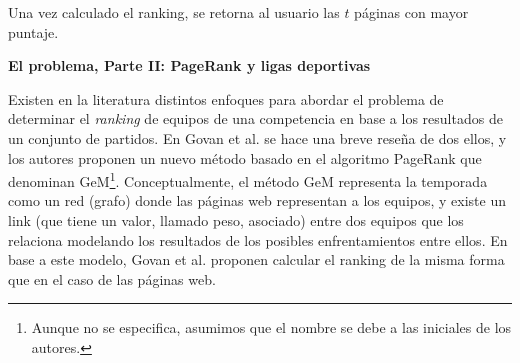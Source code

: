 Una vez calculado el ranking, se retorna al usuario las $t$ p\'aginas con mayor puntaje.

\vskip 5pt
\noindent\textbf{El problema, Parte II: PageRank y ligas deportivas}
\vskip 5pt

Existen en la literatura distintos enfoques para abordar el problema de determinar el \emph{ranking} de equipos de una competencia en
base a los resultados de un conjunto de partidos. En Govan et al. \cite{Govan2008} se hace una breve rese\~na de dos ellos, y los autores
proponen un nuevo m\'etodo basado en el algoritmo PageRank que denominan GeM\footnote{Aunque no se especifica, asumimos que el nombre se
debe a las iniciales de los autores.}. Conceptualmente, el m\'etodo GeM representa la temporada como un red (grafo) donde las p\'aginas web
representan a los equipos, y existe un link (que tiene un valor, llamado peso, asociado) entre dos equipos que los relaciona modelando los resultados de los posibles
enfrentamientos entre ellos. En base a este modelo, Govan et al. \cite{Govan2008} proponen calcular el ranking de la misma forma que en el 
caso de las p\'aginas web.

